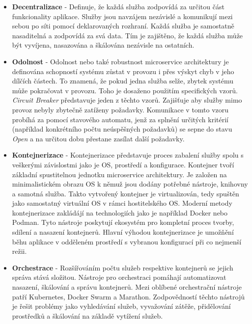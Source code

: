 \begin{itemize}
    \item \textbf{Decentralizace} - Definuje, že každá služba zodpovídá za určitou část funkcionality aplikace. Služby jsou navzájem nezávislé a komunikují mezi sebou po síti pomocí deklarovaných rozhraní. Každá služba je samostatně nasaditelná a zodpovídá za svá data. \cite{Gammelgaard2021} Tím je zajištěno, že každá služba může být vyvíjena, nasazována a škálována nezávisle na ostatních.
    \item \textbf{Odolnost} - Odolnost nebo také robustnost microservice architektury je definována schopností systému zůstat v provozu i přes výskyt chyb v jeho dílčích částech. To znamená, že pokud jedna služba selže, zbytek systému může pokračovat v provozu. Toho je dosaženo použitím specifických vzorů. \emph{Circuit Breaker} představuje jeden z těchto vzorů. Zajišťuje aby služby mimo provoz nebyly zbytečně zatíženy požadavky. Komunikace v tomto vzoru probíhá za pomocí stavového automatu, jenž za splnění určitých kritérií (například konkrétního počtu neúspěšných požadavků) se sepne do stavu \emph{Open} a na určitou dobu přestane zasílat další požadavky. \cite{Gammelgaard2021}
    \item \textbf{Kontejnerizace} - Kontejnerizace představuje proces zabalení služby spolu s veškerými závislostmi jako je OS, prostředí a konfigurace. Kontejner tvoří základní spustitelnou jednotku microservice architektury. Je založen na minimalistickém obrazu OS k němuž jsou dodány potřebné nástroje, knihovny a samotná služba. Takto vytvořený kontejner je virtualizován, tedy spuštěn jako samostatný virtuální OS v rámci hostitelského OS. \cite{dockerdocs} Moderní metody kontejnerizace zakládájí na technologiích jako je například Docker nebo Podman. Tyto nástroje poskytují ekosystém pro kompletní proces tvorby, sdílení a nasazení kontejnerů. Hlavní výhodou kontejnerizace je umožňění běhu aplikace v odděleném prostředí s vybranou konfigurací při co nejmenší režii.
    \item \textbf{Orchestrace} - Rozšířováním počtu služeb respektive kontejnerů se jejich správa stává složitou. Nástroje pro orchestraci pomáhají automatizovat nasazení, škálování a správu kontejnerů. Mezi oblíbené orchestrační nástroje patří Kubernetes, Docker Swarm a Marathon. \cite{Williams2023} Zodpovědností těchto nástrojů je řešit problémy jako vyhledávání služeb, vyvažování zátěže, přidělování prostředků a škálování na základě vytížení služeb.

\end{itemize}
